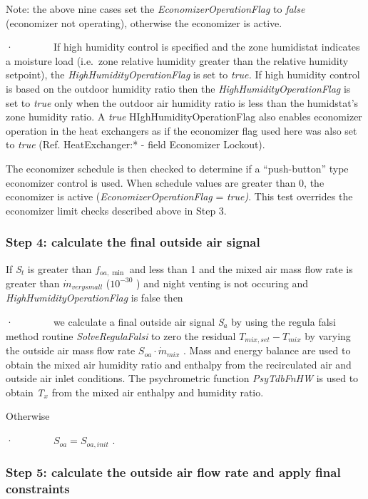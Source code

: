 Note: the above nine cases set the \emph{EconomizerOperationFlag} to \emph{false}~~~~~~ (economizer not operating), otherwise the economizer is active.

·~~~~~~~~If high humidity control is specified and the zone humidistat indicates a moisture load (i.e.~zone relative humidity greater than the relative humidity setpoint), the \emph{HighHumidityOperationFlag} is set to \emph{true.} If high humidity control is based on the outdoor humidity ratio then the \emph{HighHumidityOperationFlag} is set to \emph{true} only when the outdoor air humidity ratio is less than the humidstat's zone humidity ratio. A \emph{true} HIghHumidityOperationFlag also enables economizer operation in the heat exchangers as if the economizer flag used here was also set to \emph{true} (Ref. HeatExchanger:* - field Economizer Lockout).

The economizer schedule is then checked to determine if a ``push-button'' type economizer control is used. When schedule values are greater than 0, the economizer is active (\emph{EconomizerOperationFlag} = \emph{true)}. This test overrides the economizer limit checks described above in Step 3.

\subsubsection{Step 4: calculate the final outside air signal}\label{step-4-calculate-the-final-outside-air-signal}

If \emph{S\(_{t}\)} is greater than \({f_{oa,\min }}\) and less than 1 and the mixed air mass flow rate is greater than \({\dot m_{verysmall}}\) (\({10^{ - 30}}\) ) and night venting is not occuring and \emph{HighHumidityOperationFlag} is false then

·~~~~~~~~we calculate a final outside air signal \emph{S\(_{a}\)} by using the regula falsi method routine \emph{SolveRegulaFalsi} to zero the residual \({T_{mix,set}} - {T_{mix}}\) by varying the outside air mass flow rate \({S_{oa}}\cdot {\dot m_{mix}}\) . Mass and energy balance are used to obtain the mixed air humidity ratio and enthalpy from the recirculated air and outside air inlet conditions. The psychrometric function \emph{PsyTdbFnHW} is used to obtain \emph{T\(_{x}\)} from the mixed air enthalpy and humidity ratio.

Otherwise

·~~~~~~~~\({S_{oa}} = {S_{oa,init}}\) .

\subsubsection{Step 5: calculate the outside air flow rate and apply final constraints}\label{step-5-calculate-the-outside-air-flow-rate-and-apply-final-constraints}

